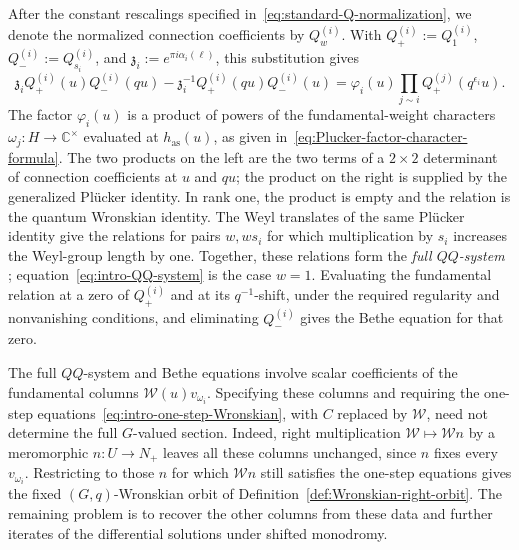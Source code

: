 \documentclass[11pt,leqno]{amsart}
\numberwithin{equation}{section}
\theoremstyle{plain}
\theoremstyle{definition}
\theoremstyle{plain}
\theoremstyle{definition}
\theoremstyle{remark}
\begin{document}
After the constant rescalings specified in~\eqref{eq:standard-Q-normalization}, we denote the normalized connection coefficients by $Q_w^{(i)}$.  With $Q_+^{(i)}:=Q_1^{(i)}$, $Q_-^{(i)}:=Q_{s_i}^{(i)}$, and $\mathfrak z_i:=e^{\pi i\alpha_i(\ell)}$, this substitution gives
\begin{equation}\label{eq:intro-QQ-system}
 \mathfrak z_i Q_+^{(i)}(u)Q_-^{(i)}(qu)
 -\mathfrak z_i^{-1}Q_+^{(i)}(qu)Q_-^{(i)}(u)
 =\varphi_i(u)\prod_{j\sim i}Q_+^{(j)}\!\left(q^{\epsilon_i}u\right).
\end{equation}
The factor $\varphi_i(u)$ is a product of powers of the fundamental-weight characters $\omega_j:H\to\mathbb C^\times$ evaluated at $h_{\mathrm{as}}(u)$, as given in~\eqref{eq:Plucker-factor-character-formula}.  The two products on the left are the two terms of a $2\times2$ determinant of connection coefficients at $u$ and $qu$; the product on the right is supplied by the generalized Pl\"ucker identity.  In rank one, the product is empty and the relation is the quantum Wronskian identity.  The Weyl translates of the same Pl\"ucker identity give the relations for pairs $w,ws_i$ for which multiplication by $s_i$ increases the Weyl-group length by one.  Together, these relations form the \emph{full $QQ$-system} \cite[Definition~3.18]{KZ2021}; equation~\eqref{eq:intro-QQ-system} is the case $w=1$.  Evaluating the fundamental relation at a zero of $Q_+^{(i)}$ and at its $q^{-1}$-shift, under the required regularity and nonvanishing conditions, and eliminating $Q_-^{(i)}$ gives the Bethe equation for that zero.

The full $QQ$-system and Bethe equations involve scalar coefficients of the fundamental columns $\mathscr W(u)v_{\omega_i}$.  Specifying these columns and requiring the one-step equations~\eqref{eq:intro-one-step-Wronskian}, with $C$ replaced by $\mathscr W$, need not determine the full $G$-valued section.  Indeed, right multiplication $\mathscr W\mapsto\mathscr W n$ by a meromorphic $n:U\to N_+$ leaves all these columns unchanged, since $n$ fixes every $v_{\omega_i}$.  Restricting to those $n$ for which $\mathscr W n$ still satisfies the one-step equations gives the fixed $(G,q)$-Wronskian orbit of Definition~\ref{def:Wronskian-right-orbit}.  The remaining problem is to recover the other columns from these data and further iterates of the differential solutions under shifted monodromy.
\end{document}

